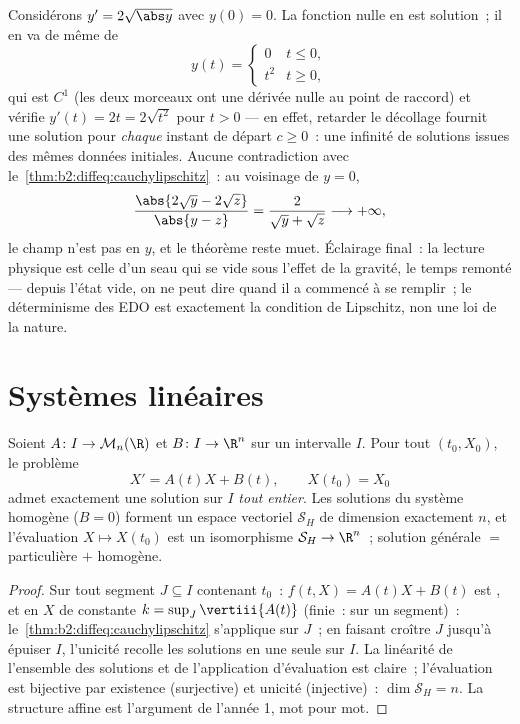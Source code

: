 \begin{example}\label{ex:b2:diffeq:leaky}
Considérons $y' = 2\sqrt{\abs y}$ avec $y(0) = 0$. La fonction
nulle en est solution~; il en va de même de
\[
y(t) = \begin{cases} 0 & t \leq 0,\\ t^2 & t \geq 0,
\end{cases}
\]
qui est $C^1$ (les deux morceaux ont une dérivée nulle au point
de raccord) et vérifie $y'(t) = 2t = 2\sqrt{t^2}$ pour $t > 0$ ---
en effet, retarder le décollage fournit une solution pour
\emph{chaque} instant de départ $c \geq 0$~: une infinité de
solutions issues des mêmes données initiales. Aucune contradiction
avec le~\cref{thm:b2:diffeq:cauchylipschitz}~: au voisinage de $y =
0$,
\[
\frac{\abs{2\sqrt y - 2\sqrt z}}{\abs{y - z}}
= \frac{2}{\sqrt y + \sqrt z} \longrightarrow +\infty ,
\]
le champ n'est pas  en $y$, et le théorème reste
muet. Éclairage final~: la lecture physique est celle d'un seau
qui se vide sous l'effet de la gravité, le temps remonté ---
depuis l'état vide, on ne peut dire quand il a commencé à se
remplir~; le déterminisme des EDO est exactement la condition de
Lipschitz, non une loi de la nature.
\end{example}

\section{Systèmes linéaires}

\begin{theorem}\label{thm:b2:diffeq:linear}
Soient $A \colon I \to \mathcal{M}_n(\R)$ et $B \colon I \to \R^n$
 sur un intervalle $I$. Pour tout $(t_0, X_0)$, le problème
\[
X' = A(t)X + B(t), \qquad X(t_0) = X_0
\]
admet exactement une solution sur $I$ \emph{tout entier}. Les
solutions du système homogène ($B = 0$) forment un espace vectoriel
$\mathcal{S}_H$ de dimension exactement $n$, et l'évaluation $X
\mapsto X(t_0)$ est un isomorphisme $\mathcal{S}_H \to \R^n$~;
solution générale $=$ particulière $+$ homogène.
\end{theorem}

\begin{proof}
Sur tout segment $J \subseteq I$ contenant $t_0$~: $f(t, X) =
A(t)X + B(t)$ est , et  en $X$ de constante $k
= \sup_J \vertiii{A(t)}$ (finie~:  sur un segment)~:
le~\cref{thm:b2:diffeq:cauchylipschitz} s'applique sur $J$~; en faisant
croître $J$ jusqu'à épuiser $I$, l'unicité recolle les solutions en
une seule sur $I$. La linéarité de l'ensemble des solutions et de
l'application d'évaluation est claire~; l'évaluation est bijective
par existence (surjective) et unicité (injective)~: $\dim
\mathcal{S}_H = n$. La structure affine est l'argument de l'année 1,
mot pour mot.
\end{proof}

